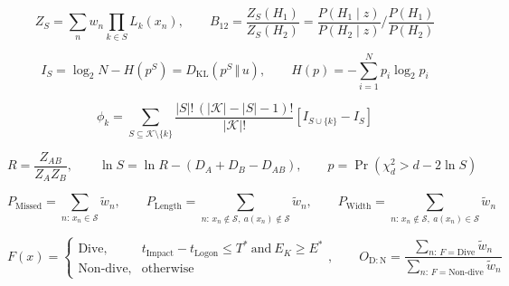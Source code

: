\begin{equation}
  Z_{S} = \sum_{n} w_{n} \prod_{k \in S} L_{k}\left(x_{n}\right), \qquad B_{12} = \frac{Z_{S}\left(H_{1}\right)}{Z_{S}\left(H_{2}\right)} = \frac{P\left(H_{1} \mid z\right)}{P\left(H_{2} \mid z\right)} \bigg/ \frac{P\left(H_{1}\right)}{P\left(H_{2}\right)}
  \label{eq:38}
\end{equation}

\begin{equation}
  I_{S} = \log_{2} N - H\left(p^{S}\right) = D_{\mathrm{KL}}\left(p^{S} \,\Vert\, u\right), \qquad H(p) = -\sum_{i=1}^{N} p_{i} \log_{2} p_{i}
  \label{eq:39}
\end{equation}

\begin{equation}
  \phi_{k} = \sum_{S \subseteq \mathcal{K} \setminus \{k\}} \frac{|S|!\, \left(|\mathcal{K}| - |S| - 1\right)!}{|\mathcal{K}|!} \left[ I_{S \cup \{k\}} - I_{S} \right]
  \label{eq:40}
\end{equation}

\begin{equation}
  R = \frac{Z_{AB}}{Z_{A} Z_{B}}, \qquad \ln S = \ln R - \left(D_{A} + D_{B} - D_{AB}\right), \qquad p = \Pr\left(\chi^{2}_{d} > d - 2 \ln S\right)
  \label{eq:41}
\end{equation}

\begin{equation}
  P_{\mathrm{Missed}} = \sum_{n:\, x_{n} \in \mathcal{S}} \tilde{w}_{n}, \qquad P_{\mathrm{Length}} = \sum_{n:\, x_{n} \notin \mathcal{S},\ a(x_{n}) \notin \mathcal{S}} \tilde{w}_{n}, \qquad P_{\mathrm{Width}} = \sum_{n:\, x_{n} \notin \mathcal{S},\ a(x_{n}) \in \mathcal{S}} \tilde{w}_{n}
  \label{eq:42}
\end{equation}

\begin{equation}
  F(x) = \begin{cases} \text{Dive}, & t_{\mathrm{Impact}} - t_{\mathrm{Logon}} \le T^{*}\ \text{and}\ E_{K} \ge E^{*} \\ \text{Non-dive}, & \text{otherwise} \end{cases}, \qquad O_{\mathrm{D:N}} = \frac{\sum_{n:\, F=\mathrm{Dive}} \tilde{w}_{n}}{\sum_{n:\, F=\text{Non-dive}} \tilde{w}_{n}}
  \label{eq:43}
\end{equation}


